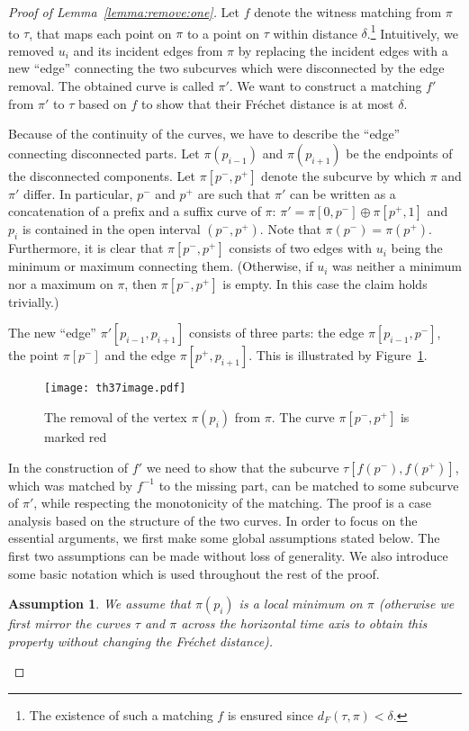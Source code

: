 \documentclass[11pt, letter]{article}
\newtheorem{assumption}[]{Assumption}
\newcommand{\lemref}[1]{Lemma~\ref{lemma:#1}}
\newcommand{\figlab}[1]{\label{fig:#1}}
\newcommand{\figref}[1]{Figure~\ref{fig:#1}}
\newcommand{\Frechet}{Fr\'echet\xspace}
\providecommand{\pth}[2][\!]{#1\left({#2}\right)}
\newcommand{\distFr}[2]{\ensuremath{d_F\pth{#1,#2}}}
\begin{document}
\begin{proof}[Proof of \lemref{remove:one}]
Let $f$ denote the witness matching from $\pi$ to $\tau$, that maps each point on $\pi$ to a point on $\tau$ within distance $\delta$.\footnote{The existence of such a matching $f$ is ensured since $\distFr{\tau}{\pi} <\delta$.} Intuitively, we removed $u_i$ and its incident edges from $\pi$ by replacing the incident edges with a new ``edge'' connecting the two subcurves which were disconnected by the edge removal. The obtained curve is called $\pi'$. We want to construct a matching $f'$ from $\pi'$ to $\tau$ based on $f$ to show that their \Frechet distance is at most $\delta$. 

Because of the continuity of the curves, 
we have to describe the ``edge'' connecting disconnected parts. Let $\pi(p_{i-1})$ and $\pi(p_{i+1})$ be the endpoints of the disconnected components. Let $\pi[p^{-},p^{+}]$ denote the subcurve by which $\pi$ and $\pi'$ differ.  In particular, $p^{-}$ and $p^{+}$ are such that $\pi'$ can be written as a concatenation of a prefix and a suffix curve of $\pi$: 
$\pi'= \pi[0,p^{-}] \oplus \pi[p^{+},1]$ 
and $p_i$ is contained in the open interval $(p^{-},p^{+})$. Note that $\pi(p^{-})=\pi(p^{+})$.  Furthermore, it is clear that $\pi[p^{-},p^{+}]$ consists of two edges with $u_i$ being the minimum or maximum connecting them. (Otherwise, if $u_i$ was neither a minimum nor a maximum on $\pi$, then $\pi[p^{-},p^{+}]$ is empty. In this case the claim holds trivially.) 

The new ``edge'' $\pi'[p_{i-1}, p_{i+1}]$ consists of three parts: the edge $\pi[p_{i-1}, p^-]$, the point $\pi[p^-]$ and the edge $\pi[p^+, p_{i+1}]$. This is illustrated by \figref{vertexremovalexample}.


\begin{figure}[h]\centering
\texttt{[image: th37image.pdf]}\\
\caption{The removal of the vertex $\pi(p_i)$ from $\pi$. The curve $\pi[p^-,p^+]$ is marked red}
\figlab{vertexremovalexample}
\end{figure}


In the construction of $f'$ we need to show that the subcurve $\tau[f(p^{-}),f(p^{+})]$, which was matched by $f^{-1}$ to the missing part, can be matched to some subcurve of $\pi'$, while respecting the monotonicity of the matching. The proof is a case analysis based on the structure of the two curves.  In order to focus on the essential arguments, we first make some global assumptions stated below.  The first two assumptions can be made without loss of generality. We also introduce some basic notation which is used throughout the rest of the proof.
\begin{assumption}
We assume that $\pi(p_i)$ is a local minimum on $\pi$ (otherwise we 
first mirror the curves $\tau$ and $\pi$ across the horizontal time axis to obtain
this property without changing the \Frechet distance).
\end{assumption}


\end{proof}
\end{document}

